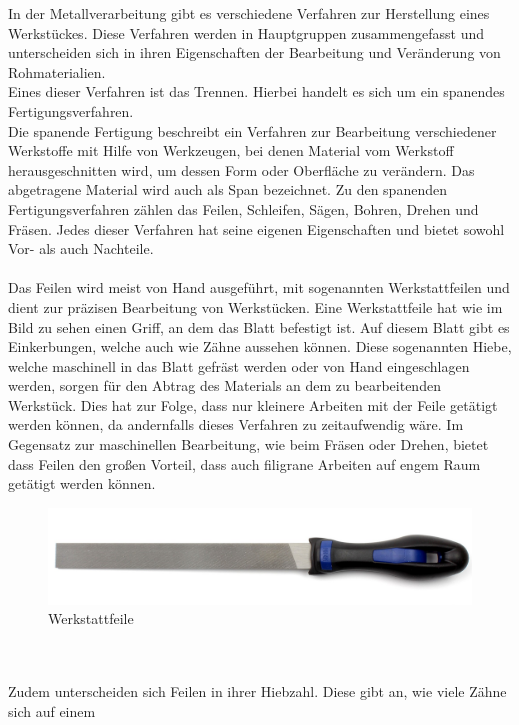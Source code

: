 In der Metallverarbeitung gibt es verschiedene Verfahren zur Herstellung eines Werkstückes. Diese Verfahren werden in Hauptgruppen zusammengefasst und
unterscheiden sich in ihren Eigenschaften der Bearbeitung und Veränderung von Rohmaterialien.
\\
Eines dieser Verfahren ist das Trennen. Hierbei handelt es sich um ein spanendes Fertigungsverfahren.
\\
Die spanende Fertigung beschreibt ein Verfahren zur Bearbeitung verschiedener Werkstoffe mit Hilfe von Werkzeugen, bei denen Material vom Werkstoff 
herausgeschnitten wird, um dessen Form oder Oberfläche zu verändern. Das abgetragene Material wird auch als Span bezeichnet.
Zu den spanenden Fertigungsverfahren zählen \zB das Feilen, Schleifen, Sägen, Bohren, Drehen und Fräsen. Jedes dieser Verfahren hat seine eigenen 
Eigenschaften und bietet sowohl Vor- als auch Nachteile.\autocite{Dietrich.2020}
\\\\
Das Feilen wird meist von Hand ausgeführt, mit sogenannten Werkstattfeilen und dient zur präzisen Bearbeitung von Werkstücken. Eine Werkstattfeile hat
wie im Bild zu sehen einen Griff, an dem das Blatt befestigt ist. Auf diesem Blatt gibt es Einkerbungen, welche auch wie Zähne aussehen können. Diese 
sogenannten Hiebe, welche maschinell in das Blatt gefräst werden oder von Hand eingeschlagen werden, sorgen für den Abtrag des Materials an dem zu 
bearbeitenden Werkstück. Dies hat zur Folge, dass nur kleinere Arbeiten mit der Feile getätigt werden können, da andernfalls dieses Verfahren zu 
zeitaufwendig wäre. Im Gegensatz zur maschinellen Bearbeitung, wie \zB beim Fräsen oder Drehen, bietet dass Feilen den großen Vorteil, dass auch filigrane 
Arbeiten auf engem Raum getätigt werden können.
\begin{figure}[hbt]
    \centering
    \includegraphics[width=1\linewidth]{images/Werkstattfeile}
    \caption[Werkstattfeile]{Werkstattfeile \autocite{Werkstattfeile}}
    \label{fig:Werkstattfeile}
\end{figure}
\\\\
Zudem unterscheiden sich Feilen in ihrer Hiebzahl. Diese gibt an, wie viele Zähne sich auf einem 
